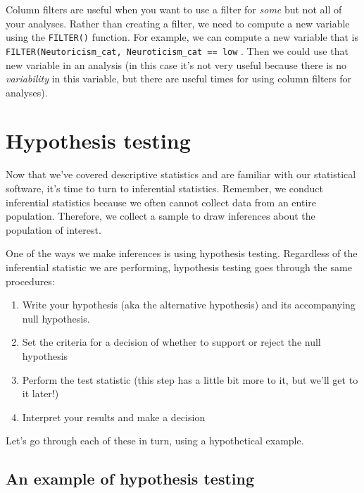\documentclass[
]{book}
\providecommand{\tightlist}{%
  \setlength{\itemsep}{0pt}\setlength{\parskip}{0pt}}
\begin{document}
Column filters are useful when you want to use a filter for \emph{some} but not all of your analyses. Rather than creating a filter, we need to compute a new variable using the \texttt{FILTER()} function. For example, we can compute a new variable that is \texttt{FILTER(Neutoricism\_cat,\ Neuroticism\_cat\ ==\ \textquotesingle{}low\textquotesingle{}} . Then we could use that new variable in an analysis (in this case it's not very useful because there is no \emph{variability} in this variable, but there are useful times for using column filters for analyses).

\hypertarget{hypothesis-testing}{%
\chapter{Hypothesis testing}\label{hypothesis-testing}}

Now that we've covered descriptive statistics and are familiar with our statistical software, it's time to turn to inferential statistics. Remember, we conduct inferential statistics because we often cannot collect data from an entire population. Therefore, we collect a sample to draw inferences about the population of interest.

One of the ways we make inferences is using hypothesis testing. Regardless of the inferential statistic we are performing, hypothesis testing goes through the same procedures:

\begin{enumerate}
\def\labelenumi{\arabic{enumi}.}
\tightlist
\item
  Write your hypothesis (aka the alternative hypothesis) and its accompanying null hypothesis.
\item
  Set the criteria for a decision of whether to support or reject the null hypothesis
\item
  Perform the test statistic (this step has a little bit more to it, but we'll get to it later!)
\item
  Interpret your results and make a decision
\end{enumerate}

Let's go through each of these in turn, using a hypothetical example.

\hypertarget{an-example-of-hypothesis-testing}{%
\section{An example of hypothesis testing}\label{an-example-of-hypothesis-testing}}
\end{document}
